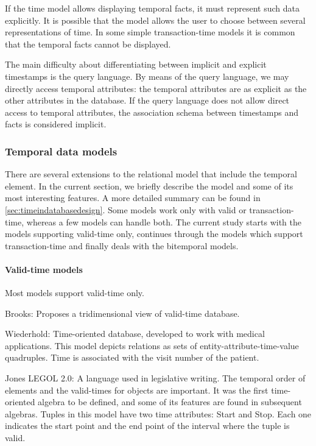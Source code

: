 	If the time model allows displaying temporal facts, it must represent such data explicitly. It is possible that the model allows the user to choose between several representations of time. In some simple transaction-time models it is common that the temporal facts cannot be displayed. 

	The main difficulty about differentiating between implicit and explicit timestamps is the query language. By means of the query language, we may directly access temporal attributes: the temporal attributes are as explicit as the other attributes in the database. If the query language does not allow direct access to temporal attributes, the association schema between timestamps and facts is considered implicit.
	
\subsubsection{\label{subsubsec:models}Temporal data models}
There are several extensions to the relational model that include the temporal element. In the current section, we briefly describe the model and some of its most interesting features. A more detailed summary can be found in \ref{sec:timeindatabasedesign}. Some models work only with valid or transaction-time, whereas a few models can handle both. The current study starts with the models supporting valid-time only, continues through the models which support transaction-time and finally deals with the bitemporal models.

\paragraph{Valid-time models}
Most models support valid-time only.

Brooks:  \cite{brooks56} Proposes a tridimensional view of valid-time database.

Wiederhold: \cite{Blum:1981:DCD:1672611.1672632} Time-oriented database, developed to work with medical applications. This model depicts relations as sets of entity-attribute-time-value quadruples. Time is associated with the visit number of the patient. 

Jones LEGOL 2.0: \cite{legol20} A language used in legislative writing. The temporal order of elements and the valid-times for objects are important. It was the first time-oriented algebra to be defined, and some of its features are found in subsequent algebras.
Tuples in this model have two time attributes: Start and Stop. Each one indicates the start point and the end point of the interval where the tuple is valid.

